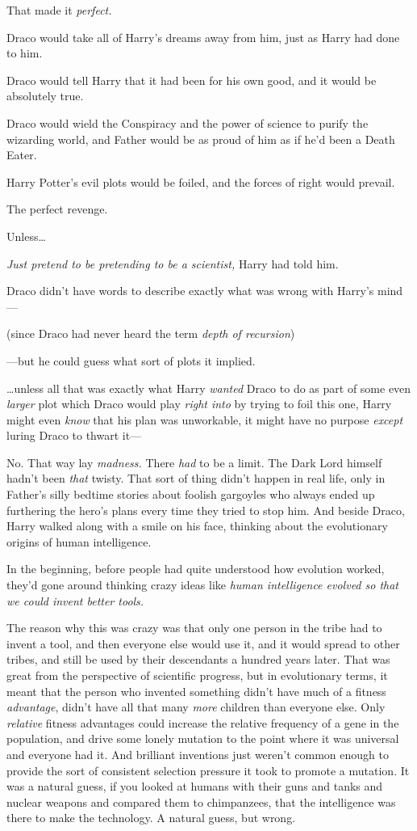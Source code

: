 That made it \emph{perfect.}

Draco would take all of Harry's dreams away from him, just as Harry had done to 
him.

Draco would tell Harry that it had been for his own good, and it would be 
absolutely true.

Draco would wield the Conspiracy and the power of science to purify the 
wizarding world, and Father would be as proud of him as if he'd been a Death 
Eater.

Harry Potter's evil plots would be foiled, and the forces of right would 
prevail.

The perfect revenge.

Unless{\ldots}

\emph{Just pretend to be pretending to be a scientist,} Harry had told him.

Draco didn't have words to describe exactly what was wrong with Harry's mind---

(since Draco had never heard the term \emph{depth of recursion})

---but he could guess what sort of plots it implied.

{\ldots}unless all that was exactly what Harry \emph{wanted} Draco to do as 
part of some even \emph{larger} plot which Draco would play \emph{right into} 
by trying to foil this one, Harry might even \emph{know} that his plan was 
unworkable, it might have no purpose \emph{except} luring Draco to thwart it---

No. That way lay \emph{madness.} There \emph{had} to be a limit. The Dark Lord 
himself hadn't been \emph{that} twisty. That sort of thing didn't happen in 
real life, only in Father's silly bedtime stories about foolish gargoyles who 
always ended up furthering the hero's plans every time they tried to stop him.
\sbreak
And beside Draco, Harry walked along with a smile on his face, thinking about 
the evolutionary origins of human intelligence.

In the beginning, before people had quite understood how evolution worked, 
they'd gone around thinking crazy ideas like \emph{human intelligence evolved 
so that we could invent better tools.}

The reason why this was crazy was that only one person in the tribe had to 
invent a tool, and then everyone else would use it, and it would spread to 
other tribes, and still be used by their descendants a hundred years later. 
That was great from the perspective of scientific progress, but in evolutionary 
terms, it meant that the person who invented something didn't have much of a 
fitness \emph{advantage}, didn't have all that many \emph{more} children than 
everyone else. Only \emph{relative} fitness advantages could increase the 
relative frequency of a gene in the population, and drive some lonely mutation 
to the point where it was universal and everyone had it. And brilliant 
inventions just weren't common enough to provide the sort of consistent 
selection pressure it took to promote a mutation. It was a natural guess, if 
you looked at humans with their guns and tanks and nuclear weapons and compared 
them to chimpanzees, that the intelligence was there to make the technology. A 
natural guess, but wrong.

